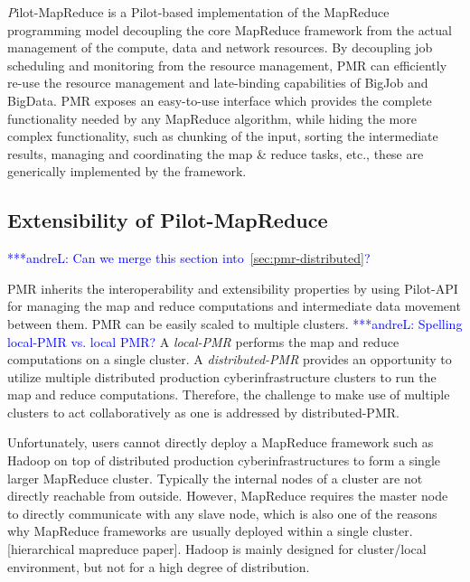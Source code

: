\documentclass{acm_proc_article-sp}
\newcommand{\alnote}[1]{ {\textcolor{blue} { ***andreL: #1 }}}
\newcommand{\alnote}[1]{}
\newcommand{\pilot}{Pilot\xspace}
\newcommand{\pilotmapreduce}{Pilot-MapReduce\xspace}
\begin{document}
{\emph \pilotmapreduce}  is a \pilot-based implementation of the 
MapReduce programming model decoupling the core MapReduce framework from the 
actual management of the compute, data and network resources. By decoupling 
job scheduling and monitoring from the resource management, PMR 
can efficiently re-use the resource management and late-binding capabilities 
of BigJob and BigData. PMR exposes an easy-to-use interface which provides the complete
functionality needed by any MapReduce algorithm, while hiding the more complex
functionality, such as chunking of the input, sorting the intermediate
results, managing and coordinating the map \& reduce tasks, etc., these are generically
implemented by the framework. 

\subsection{Extensibility of \pilotmapreduce}
\alnote{Can we merge this section into~\ref{sec:pmr-distributed}?}

PMR inherits the interoperability and extensibility properties by using Pilot-API for managing 
the map and reduce computations and intermediate data movement between them.
PMR can be easily scaled to multiple clusters. 
\alnote{Spelling local-PMR vs. local PMR?}
A {\it local-PMR}  performs the map and reduce computations on a single cluster. 
A {\it distributed-PMR} provides an opportunity to utilize multiple distributed production cyberinfrastructure clusters to run the map and reduce computations.
Therefore, the challenge to make use of multiple clusters to act collaboratively as one is addressed by distributed-PMR.

Unfortunately, users cannot directly deploy a MapReduce framework such as Hadoop on top of distributed production cyberinfrastructures to form a single larger MapReduce cluster. 
Typically the internal nodes of a cluster are not directly reachable from outside. However, MapReduce requires the master node to directly communicate with any slave node,
which is also one of the reasons why MapReduce frameworks are usually deployed within a single cluster. [hierarchical mapreduce paper]. Hadoop is mainly designed for cluster/local environment,
 but not for a high degree of distribution.



\end{document}

